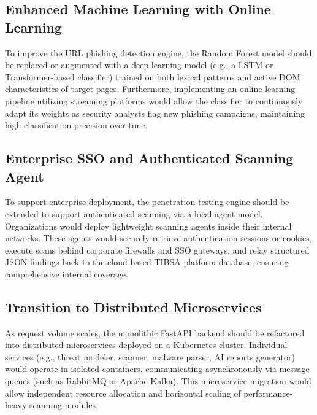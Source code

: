 \subsection{Enhanced Machine Learning with Online Learning}
To improve the URL phishing detection engine, the Random Forest model should be replaced or augmented with a deep learning model (e.g., a LSTM or Transformer-based classifier) trained on both lexical patterns and active DOM characteristics of target pages. Furthermore, implementing an online learning pipeline utilizing streaming platforms would allow the classifier to continuously adapt its weights as security analysts flag new phishing campaigns, maintaining high classification precision over time.

\subsection{Enterprise SSO and Authenticated Scanning Agent}
To support enterprise deployment, the penetration testing engine should be extended to support authenticated scanning via a local agent model. Organizations would deploy lightweight scanning agents inside their internal networks. These agents would securely retrieve authentication sessions or cookies, execute scans behind corporate firewalls and SSO gateways, and relay structured JSON findings back to the cloud-based TIBSA platform database, ensuring comprehensive internal coverage.

\subsection{Transition to Distributed Microservices}
As request volume scales, the monolithic FastAPI backend should be refactored into distributed microservices deployed on a Kubernetes cluster. Individual services (e.g., threat modeler, scanner, malware parser, AI reports generator) would operate in isolated containers, communicating asynchronously via message queues (such as RabbitMQ or Apache Kafka). This microservice migration would allow independent resource allocation and horizontal scaling of performance-heavy scanning modules.
